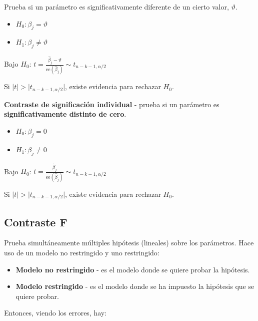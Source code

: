 \documentclass[10pt, a4paper, landscape]{extarticle}
\newcommand{\se}{\mathrm{ee}}
\begin{document}
\begin{multicols}{3}
Prueba si un parámetro es significativamente diferente de un cierto valor, $\vartheta$.

\begin{itemize}[leftmargin=*]
	\item $H_0: \beta_j = \vartheta$
	\item $H_1: \beta_j \neq \vartheta$
\end{itemize}

\begin{center}
	Bajo $H_0$: \quad $t = \frac{\hat{\beta}_j - \vartheta}{\se(\hat{\beta}_j)} \sim t_{n - k - 1, \alpha/2}$
\end{center}

Si $\lvert t \rvert > \lvert t_{n - k - 1, \alpha/2} \rvert$, existe evidencia para rechazar $H_0$.

\textbf{Contraste de significación individual} - prueba si un parámetro es \textbf{significativamente distinto de cero}.

\begin{itemize}[leftmargin=*]
	\item $H_0: \beta_j = 0$
	\item $H_1: \beta_j \neq 0$
\end{itemize}

\begin{center}
	Bajo $H_0$: \quad $t = \frac{\hat{\beta}_j}{\se(\hat{\beta}_j)} \sim t_{n - k - 1, \alpha/2}$
\end{center}

Si $\lvert t \rvert > \lvert t_{n - k - 1, \alpha/2} \rvert$, existe evidencia para rechazar $H_0$.

\subsection*{Contraste F}

Prueba simultáneamente múltiples hipótesis (lineales) sobre los parámetros. Hace uso de un modelo no restringido y uno restringido:

\begin{itemize}[leftmargin=*]
	\item \textbf{Modelo no restringido} - es el modelo donde se quiere probar la hipótesis.
	\item \textbf{Modelo restringido} - es el modelo donde se ha impuesto la hipótesis que se quiere probar.
\end{itemize}

Entonces, viendo los errores, hay:


\end{multicols}
\end{document}
